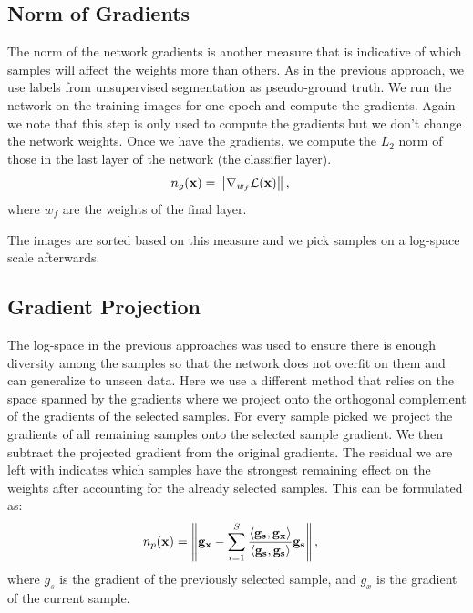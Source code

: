 \documentclass[letterpaper, 10 pt, conference]{ieeeconf}  %
\begin{document}
\subsection{Norm of Gradients} \label{sec:grad_norm}

The norm of the network gradients is another measure that is indicative of which samples will affect the weights more than others. As in the previous approach, we use labels from unsupervised segmentation as pseudo-ground truth. We run the network on the training images for one epoch and compute the gradients. Again we note that this step is only used to compute the gradients but we don't change the network weights. Once we have the gradients, we compute the $L_2$ norm of those in the last layer of the network (the classifier layer).
\begin{align}
n_g(\bold{x}) &=  \left\lVert \nabla_{w_f} \mathcal{L}(\bold{x}) \right\rVert,
\end{align}  
where $w_f$ are the weights of the final layer.

The images are sorted based on this measure and we pick samples on a log-space scale afterwards.

\subsection{Gradient Projection} \label{sec:grad_proj}

The log-space in the previous approaches was used to ensure there is enough diversity among the samples so that the network does not overfit on them and can generalize to unseen data. Here we use a different method that relies on the space spanned by the gradients where we project onto the orthogonal complement of the gradients of the selected samples. For every sample picked we project the gradients of all remaining samples onto the selected sample gradient. We then subtract the projected gradient from the original gradients. The residual we are left with indicates which samples have the strongest remaining effect on the weights after accounting for the already selected samples. This can be formulated as:
\begin{align}
n_p(\bold{x}) &=  \left\lVert \bold{g_x} - \sum_{i=1}^S \frac{\left\langle \bold{g_s}, \bold{g_x} \right\rangle}{\left\langle \bold{g_s}, \bold{g_s} \right\rangle} \bold{g_s} \right\rVert,
\end{align}
where $g_s$ is the gradient of the previously selected sample, and $g_x$ is the gradient of the current sample.
\end{document}

